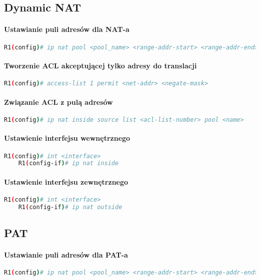 \documentclass[12pt]{article}
\begin{document}
	\subsection{Dynamic NAT}
	\paragraph{Ustawianie puli adresów dla NAT-a}
	\begin{lstlisting}[language=bash]
	R1(config)# ip nat pool <pool_name> <range-addr-start> <range-addr-end> netmask <mask>
	\end{lstlisting}
	\paragraph{Tworzenie ACL akceptującej tylko adresy do translacji}
	\begin{lstlisting}[language=bash]
	R1(config)# access-list 1 permit <net-addr> <negate-mask>
	\end{lstlisting}
	\paragraph{Związanie ACL z pulą adresów}
	\begin{lstlisting}[language=bash]
	R1(config)# ip nat inside source list <acl-list-number> pool <name>
	\end{lstlisting}
	\paragraph{Ustawienie interfejsu wewnętrznego}
	\begin{lstlisting}[language=bash]
	R1(config)# int <interface>
	R1(config-if)# ip nat inside
	\end{lstlisting}
	\paragraph{Ustawienie interfejsu zewnętrznego}
	\begin{lstlisting}[language=bash]
	R1(config)# int <interface>
	R1(config-if)# ip nat outside
	\end{lstlisting}
	
	\subsection{PAT}
	\paragraph{Ustawianie puli adresów dla PAT-a}
	\begin{lstlisting}[language=bash]
	R1(config)# ip nat pool <pool_name> <range-addr-start> <range-addr-end> netmask <mask>
	\end{lstlisting}
\end{document}
